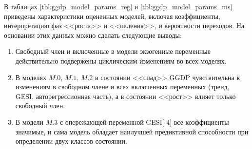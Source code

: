 \documentclass[a4paper,14pt]{extreport}
\begin{document}
В таблицах \ref{tbl:ggdp_model_params_reg} и \ref{tbl:ggdp_model_params_ms} приведены характеристики оцененных моделей, включая коэффициенты, интерпретацию фаз <<роста>> и <<падения>>, и вероятности переходов. На основании этих данных можно сделать следующие выводы:

\begin{enumerate}
	\item Свободный член и включенные в модели экзогенные переменные действительно подвержены циклическим изменениям во всех моделях.
	\item В моделях $M.0$, $M.1$, $M.2$ в состоянии <<спад>> GGDP чувствительна к изменениям в свободном члене и всех включенных переменных (тренд, GESI, авторегрессионная часть), а в состоянии <<рост>> влияет только свободный член.
	\item В модели $M.3$ с опережающей переменной GESI[-4] все коэффициенты значимые, и сама модель обладает наилучшей предиктивной способности при определении двух классов состоянии.
\end{enumerate}
\end{document}
